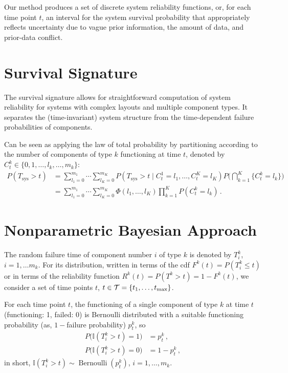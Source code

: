 \documentclass[authoryear, 12pt, a4paper]{elsarticle}
\def\Tsys{T_\text{sys}}
\newcommand{\indic}{\mathbb{I}}
\newcommand{\ber}{\operatorname{Bernoulli}}
\def\tmax{t_\text{max}}
\begin{document}
Our method produces a set of discrete system reliability functions,
or, for each time point $t$, an interval for the system survival probability
that appropriately reflects uncertainty due to vague prior information, the amount of data, and prior-data conflict.


\section{Survival Signature}

The survival signature allows for straightforward computation of system reliability
for systems with complex layouts and multiple component types.
It separates the (time-invariant) system structure from the time-dependent failure probabilities of components.

Can be seen as applying the law of total probability by partitioning
according to the number of components of type $k$ functioning at time $t$,
denoted by $C^k_t \in \{0, 1, \ldots, l_k, \ldots, m_k\}$:
\begin{align*}
P(\Tsys > t)
 &= \sum_{l_1=0}^{m_1} \cdots \sum_{l_K=0}^{m_K} P(\Tsys > t \mid C^1_t = l_1,\ldots, C^K_t = l_K)
                                                 P\Big( \bigcap_{k=1}^K \{ C^k_t = l_k\} \Big) \\
 &= \sum_{l_1=0}^{m_1} \cdots \sum_{l_K=0}^{m_K} \Phi(l_1, \ldots, l_K)
                                                 \prod_{k=1}^K P(C^k_t = l_k) \,.
\end{align*}


\section{Nonparametric Bayesian Approach}

The random failure time of component number $i$ of type $k$ is denoted by $T^k_i$, $i = 1, \ldots m_k$.
For its distribution, written in terms of the cdf $F^k(t) = P(T^k_i \le t)$
or in terms of the reliability function $R^k(t) = P(T^k > t) = 1 - F^k(t)$,
we consider a set of time points $t$, $t \in {\cal T} = \{t_1, \ldots, \tmax\}$.

For each time point $t$, the functioning of a single component of type $k$ at time $t$ (functioning: 1, failed: 0)
is Bernoulli distributed with a suitable functioning probability (as, $1-$failure probability) $p^k_t$, so
\begin{align*}
P\big(\indic(T^k_i > t) = 1\big) &= p^k_t\,, \\
P\big(\indic(T^k_i > t) = 0\big) &= 1 - p^k_t\,,
\end{align*}
in short, $\indic(T^k_i > t) \sim \ber(p^k_t)$, $i = 1, \ldots, m_k$.
\end{document}
